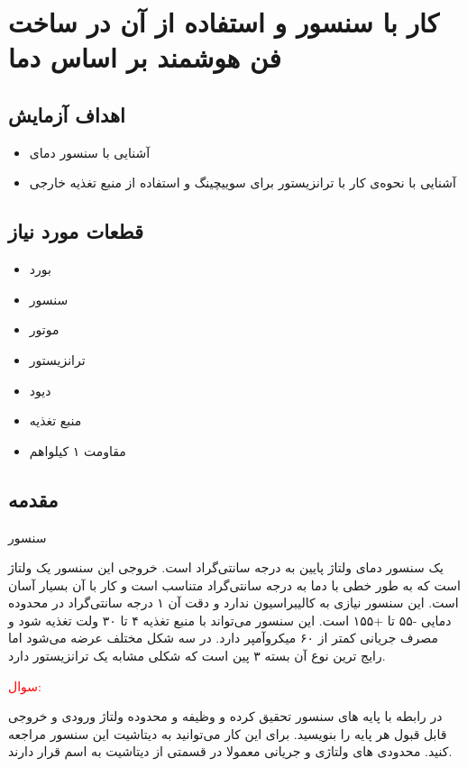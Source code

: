 \section{کار با سنسور  و استفاده از آن در ساخت فن هوشمند بر اساس دما}

\subsection{اهداف آزمایش}
\begin{itemize}
    \item آشنایی با سنسور دمای 
    \item آشنایی با نحوه‌ی کار با ترانزیستور برای سوییچینگ و استفاده از منبع تغذیه خارجی
\end{itemize}
\subsection{قطعات مورد نیاز}
\begin{itemize}
    \item بورد 
    \item سنسور 
    \item موتور 
    \item ترانزیستور 
    \item دیود 
    \item منبع تغذیه
    \item مقاومت ۱ کیلواهم
\end{itemize}

\subsection{مقدمه}

\begin{nas} سنسور  \end{nas}
\newline
{} یک سنسور دمای ولتاژ پایین به درجه سانتی‌گراد است. خروجی این سنسور یک ولتاژ است که به طور خطی با دما به درجه سانتی‌گراد متناسب است و کار با آن بسیار آسان است.
\newline
این سنسور نیازی به کالیبراسیون ندارد و دقت آن ۱ درجه سانتی‌گراد در محدوده دمایی -۵۵ تا +۱۵۵ است. این سنسور می‌تواند با منبع تغذیه ۴ تا ۳۰ ولت تغذیه شود و مصرف جریانی کمتر از ۶۰ میکروآمپر دارد.
\newline
{} در سه شکل مختلف عرضه می‌شود اما رایج ترین نوع آن بسته ۳ پین است که شکلی مشابه یک ترانزیستور دارد.

\newline
\textcolor{red}{\begin{nas}سوال: \end{nas}}
در رابطه با پایه های سنسور  تحقیق کرده و وظیفه و محدوده ولتاژ ورودی و خروجی قابل قبول هر پایه را بنویسید. برای این کار می‌توانید به دیتاشیت این سنسور مراجعه کنید. محدودی های ولتاژی و جریانی معمولا در قسمتی از دیتاشیت به اسم  قرار دارند.
\newline

